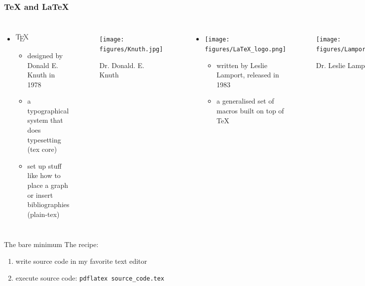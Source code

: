 \documentclass{beamer}
\begin{document}
\begin{frame}[shrink=15]
\frametitle{{\TeX} and {\LaTeX}}
    
\begin{columns}
    \begin{itemize}
        \item \includegraphics[height=0.4cm]{figures/TeX_logo.png}
        \begin{itemize}
            \item designed by Donald E. Knuth in 1978
            \item a typographical system that does typesetting (tex core)
            \item set up stuff like how to place a graph or insert bibliographies (plain-tex)
        \end{itemize}
    \end{itemize}
    \begin{figure}
        \centering
            \texttt{[image: figures/Knuth.jpg]}%
            \caption{Dr. Donald. E. Knuth}
    \end{figure}
    

    \begin{itemize}
        \item \texttt{[image: figures/LaTeX\_logo.png]}
        \begin{itemize}
            \item written by Leslie Lamport, released in 1983
            \item a generalised set of macros built on top of {\TeX}
        \end{itemize}
    \end{itemize}
    \begin{figure}
        \centering
        \texttt{[image: figures/Lamport.jpg]}
        \caption{Dr. Leslie Lamport}
    \end{figure}
\end{columns}
\end{frame}

\begin{frame}{The bare minimum}
The recipe:\\
\begin{enumerate}
    \item write source code in my favorite text editor
    \item execute source code: \texttt{pdflatex source\_code.tex}
\end{enumerate}
\pause
\centering
{}
\end{frame}
\end{document}
